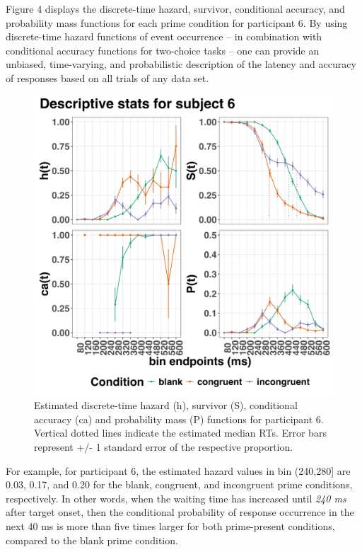 \documentclass[
  man, donotrepeattitle,floatsintext]{apa6}
\begin{document}
Figure 4 displays the discrete-time hazard, survivor, conditional accuracy, and probability mass functions for each prime condition for participant 6. By using discrete-time hazard functions of event occurrence -- in combination with conditional accuracy functions for two-choice tasks -- one can provide an unbiased, time-varying, and probabilistic description of the latency and accuracy of responses based on all trials of any data set.



\begin{figure}[H]

{\centering \includegraphics[width=21.33in,height=0.67\textheight,]{../Tutorial_1_descriptive_stats/figures/Plot_for_subject6_PanisSchmidt} 

}

\caption{Estimated discrete-time hazard (h), survivor (S), conditional accuracy (ca) and probability mass (P) functions for participant 6. Vertical dotted lines indicate the estimated median RTs. Error bars represent +/- 1 standard error of the respective proportion.}\label{fig:eha-plot}
\end{figure}

For example, for participant 6, the estimated hazard values in bin (240,280{]} are 0.03, 0.17, and 0.20 for the blank, congruent, and incongruent prime conditions, respectively. In other words, when the waiting time has increased until \emph{240 ms} after target onset, then the conditional probability of response occurrence in the next 40 ms is more than five times larger for both prime-present conditions, compared to the blank prime condition.
\end{document}
